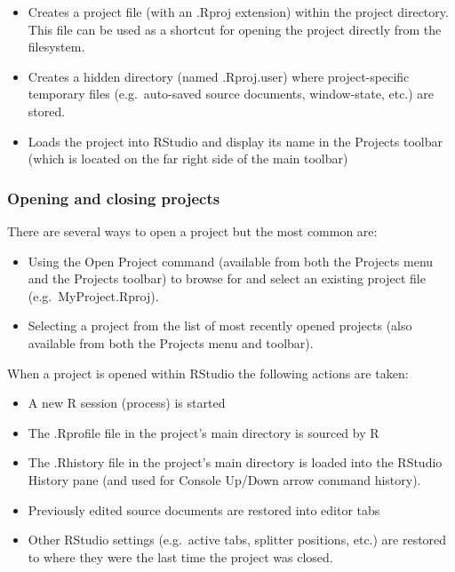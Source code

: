 \documentclass[
]{book}
\providecommand{\tightlist}{%
  \setlength{\itemsep}{0pt}\setlength{\parskip}{0pt}}
\begin{document}
\begin{itemize}
\tightlist
\item
  Creates a project file (with an .Rproj extension) within the project
  directory. This file can be used as a shortcut for opening the project
  directly from the filesystem.
\item
  Creates a hidden directory (named .Rproj.user) where project-specific
  temporary files (e.g.~auto-saved source documents, window-state, etc.)
  are stored.
\item
  Loads the project into RStudio and display its name in the Projects
  toolbar (which is located on the far right side of the main toolbar)
\end{itemize}

\hypertarget{openproj}{%
\subsubsection{Opening and closing projects}\label{openproj}}

There are several ways to open a project but the most common are:

\begin{itemize}
\tightlist
\item
  Using the Open Project command (available from both the Projects menu
  and the Projects toolbar) to browse for and select an existing project
  file (e.g.~MyProject.Rproj).
\item
  Selecting a project from the list of most recently opened projects
  (also available from both the Projects menu and toolbar).
\end{itemize}

When a project is opened within RStudio the following actions are taken:

\begin{itemize}
\tightlist
\item
  A new R session (process) is started
\item
  The .Rprofile file in the project's main directory is sourced by R
\item
  The .Rhistory file in the project's main directory is loaded into the
  RStudio History pane (and used for Console Up/Down arrow command
  history).
\item
  Previously edited source documents are restored into editor tabs
\item
  Other RStudio settings (e.g.~active tabs, splitter positions, etc.)
  are restored to where they were the last time the project was closed.
\end{itemize}
\end{document}
